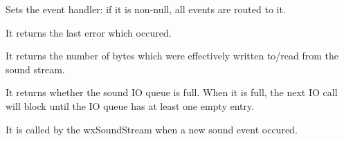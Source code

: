 
Sets the event handler: if it is non-null, all events are routed to it.

\label{wxsoundstreamgeterror}


It returns the last error which occured.

\label{wxsoundstreamgetlastaccess}


It returns the number of bytes which were effectively written to/read from the sound stream.

\label{wxsoundstreamqueuefilled}


It returns whether the sound IO queue is full. When it is full, the next IO call will block
until the IO queue has at least one empty entry.

\label{wxsoundstreamonsoundevent}


It is called by the wxSoundStream when a new sound event occured.

